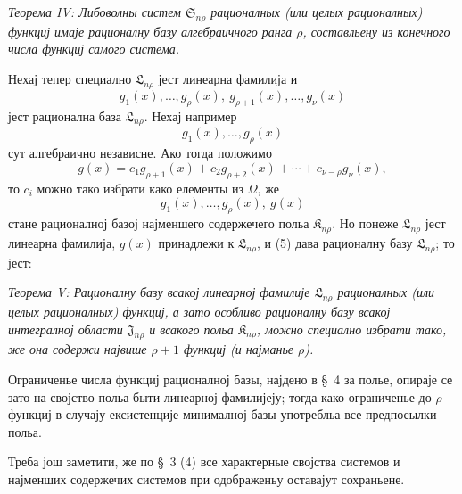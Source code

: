 ﻿\documentclass[11pt]{article}
\providecommand{\Kfield}{\mathfrak{K}}
\providecommand{\Ssys}{\mathfrak{S}}
\providecommand{\Jdom}{\mathfrak{J}}
\providecommand{\Lsys}{\mathfrak{L}}
\begin{document}
{\itshape Теорема IV: Либоволны систем $\Ssys_{n\rho}$ рационалных (или целых рационалных) функциј имаје рационалну базу алгебраичного ранга $\rho$, составльену из конечного числа функциј самого система.}

Нехај тепер специално $\Lsys_{n\rho}$ јест линеарна фамилија и
\begin{equation}
  g_1(x),\ldots,g_\rho(x),\ g_{\rho+1}(x),\ldots,g_\nu(x)
\tag{4}
\end{equation}
јест рационална база $\Lsys_{n\rho}$. Нехај например
\[
  g_1(x),\ldots,g_\rho(x)
\]
сут алгебраично независне. Ако тогда положимо
\[
  g(x)=c_1g_{\rho+1}(x)+c_2g_{\rho+2}(x)+\cdots+c_{\nu-\rho}g_\nu(x),
\]
то $c_i$ можно тако избрати како елементы из $\Omega$, же
\begin{equation}
  g_1(x),\ldots,g_\rho(x),\ g(x)
\tag{5}
\end{equation}
стане рационалној базој најменшего содержечего польа $\Kfield_{n\rho}$. Но понеже $\Lsys_{n\rho}$ јест линеарна фамилија, $g(x)$ принадлежи к $\Lsys_{n\rho}$, и (5) дава рационалну базу $\Lsys_{n\rho}$; то јест:

{\itshape Теорема V: Рационалну базу всакој линеарној фамилије $\Lsys_{n\rho}$ рационалных (или целых рационалных) функциј, а зато особливо рационалну базу всакој интегралној области $\Jdom_{n\rho}$ и всакого польа $\Kfield_{n\rho}$, можно специално избрати тако, же она содержи највише $\rho+1$ функциј (и најманье $\rho$).}

Ограниченье числа функциј рационалној базы, најдено в \S\ 4 за полье, опираје се зато на својство польа быти линеарној фамилијеју; тогда како ограниченье до $\rho$ функциј в случају ексистенције минималној базы употребльа все предпосылки польа.

Треба још заметити, же по \S\ 3 (4) все характерные својства системов и најменших содержечих системов при одображеньу оставајут сохраньене.
\end{document}

